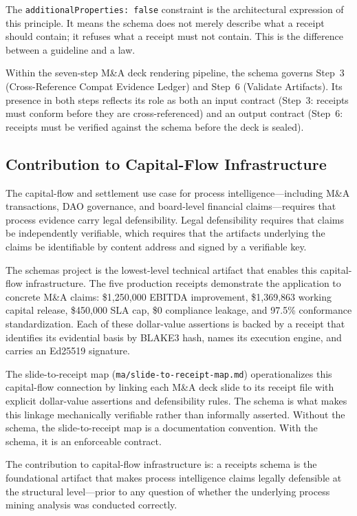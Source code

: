 The \texttt{additionalProperties: false} constraint is the architectural expression of this
principle. It means the schema does not merely describe what a receipt should contain; it refuses
what a receipt must not contain. This is the difference between a guideline and a law.

Within the seven-step M\&A deck rendering pipeline, the schema governs Step~3 (Cross-Reference
Compat Evidence Ledger) and Step~6 (Validate Artifacts). Its presence in both steps reflects its
role as both an input contract (Step~3: receipts must conform before they are cross-referenced)
and an output contract (Step~6: receipts must be verified against the schema before the deck is
sealed).

\subsection{Contribution to Capital-Flow Infrastructure}
\label{sec:schemas-contribution-capital}

The capital-flow and settlement use case for process intelligence---including M\&A transactions,
DAO governance, and board-level financial claims---requires that process evidence carry legal
defensibility. Legal defensibility requires that claims be independently verifiable, which requires
that the artifacts underlying the claims be identifiable by content address and signed by a
verifiable key.

The schemas project is the lowest-level technical artifact that enables this capital-flow
infrastructure. The five production receipts demonstrate the application to concrete M\&A claims:
\$1,250,000 EBITDA improvement, \$1,369,863 working capital release, \$450,000 SLA cap,
\$0 compliance leakage, and 97.5\% conformance standardization. Each of these dollar-value
assertions is backed by a receipt that identifies its evidential basis by BLAKE3 hash, names its
execution engine, and carries an Ed25519 signature.

The slide-to-receipt map (\texttt{ma/slide-to-receipt-map.md}) operationalizes this capital-flow
connection by linking each M\&A deck slide to its receipt file with explicit dollar-value
assertions and defensibility rules. The schema is what makes this linkage mechanically verifiable
rather than informally asserted. Without the schema, the slide-to-receipt map is a documentation
convention. With the schema, it is an enforceable contract.

The contribution to capital-flow infrastructure is: a receipts schema is the foundational artifact
that makes process intelligence claims legally defensible at the structural level---prior to any
question of whether the underlying process mining analysis was conducted correctly.
